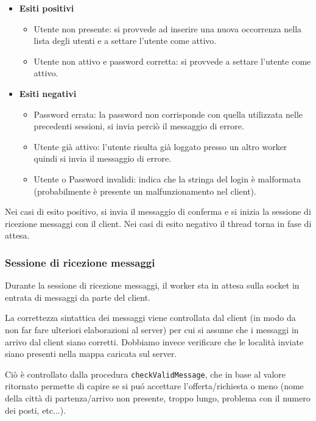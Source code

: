 \documentclass[a4paper,10pt]{article}
\begin{document}
\begin{itemize}
	\item \textbf{Esiti positivi}
	\begin{itemize}
		\item Utente non presente: si provvede ad inserire una nuova occorrenza nella lista degli utenti e a settare l'utente come attivo.
		\item Utente non attivo e password corretta: si provvede a settare l'utente come attivo.
	\end{itemize}
	\item \textbf{Esiti negativi}
	\begin{itemize}
		\item Password errata: la password non corrisponde con quella utilizzata nelle precedenti sessioni, si invia perci\`o il messaggio di errore.
		\item Utente gi\`a attivo: l'utente risulta gi\`a loggato presso un altro worker quindi si invia il messaggio di errore.
		\item Utente o Password invalidi: indica che la stringa del login \`e malformata (probabilmente \`e presente un malfunzionamento nel client).
	\end{itemize}
\end{itemize}
Nei casi di esito positivo, si invia il messaggio di conferma e si inizia la sessione di ricezione messaggi con il client. Nei casi di esito negativo il thread torna in fase di attesa.

\subsubsection{Sessione di ricezione messaggi}

Durante la sessione di ricezione messaggi, il worker sta in attesa sulla socket in entrata di messaggi da parte del client.

La correttezza sintattica dei messaggi viene controllata dal client (in modo da non far fare ulteriori elaborazioni al server) per cui si assume che i messaggi in arrivo dal client siano corretti. Dobbiamo invece verificare che le localit\`a inviate siano presenti nella mappa caricata sul server.

Ci\`o \`e controllato dalla procedura \texttt{checkValidMessage}, che in base al valore ritornato permette di capire se si pu\'o accettare l'offerta/richiesta o meno (nome della citt\`a di partenza/arrivo non presente, troppo lungo, problema con il numero dei posti, etc...).
\end{document}
